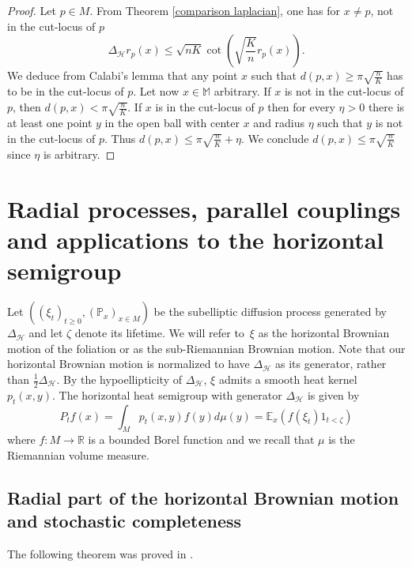 \documentclass[11pt]{article}
\numberwithin{equation}{section}
\newcommand{\M}{\mathbb M}
\newcommand{\ch}{\mathcal H}
\begin{document}
\begin{proof}
Let $p \in M$. From Theorem \ref{comparison laplacian}, one has for $x\neq p $, not in the cut-locus of $p$
\begin{equation*}
\Delta_{\mathcal{H}} r_{p}(x) \le \sqrt {nK} \cot \left(\sqrt {\frac{K}{n}} r_{p}(x)\right).
\end{equation*}
We deduce from Calabi's lemma that any point $x$ such that $d (p,x) \ge \pi \sqrt{ \frac{n}{K}}$ has to be in the cut-locus of $p$.
Let now $x \in \M$ arbitrary. If $x$ is not in the cut-locus of $p$, then $d(p,x) < \pi \sqrt{ \frac{n}{K}}$. If $x$ is in the cut-locus of $p$ then for every $\eta >0$ there is at least one point $y$ in the open ball with center $x$ and radius $\eta$ such that $y$ is not in the cut-locus of $p$. Thus $d(p , x)\le \pi \sqrt{ \frac{n}{K}} +\eta$. We conclude $d(p , x)\le \pi \sqrt{ \frac{n}{K}}$ since $\eta$ is arbitrary.
\end{proof}



\section{Radial processes, parallel couplings and  applications to the horizontal semigroup}



Let $( ( \xi_t )_{t \ge 0} , ( \mathbb P_x )_{x \in M} )$ be the subelliptic
diffusion process generated by $\Delta_{\ch}$ and let $\zeta$ denote its
lifetime. We will refer to~$\xi$
as the horizontal Brownian motion of the foliation or as the
sub-Riemannian Brownian motion. Note that our horizontal Brownian motion is normalized to have $\Delta_{\ch}$ as its generator, rather than $\frac{1}{2}\Delta_{\ch}$.  By the hypoellipticity of $\Delta_{\ch}$, $\xi$ admits a smooth heat
kernel $p_t (x,y)$. The horizontal heat semigroup with generator $\Delta_{\ch}$ is given by
\[
P_t f(x)=\int_M p_t (x,y) f(y) d\mu(y)=\mathbb{E}_x \left( f(\xi_t) 1_{t < \zeta} \right) 
\]
where $f: M\to \mathbb{R}$ is a bounded Borel function and we recall that $\mu$ is the Riemannian volume measure.



\subsection{Radial part of the horizontal Brownian motion and stochastic completeness}
The following theorem was proved in \cite{radial}.
\end{document}
